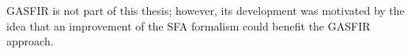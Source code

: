 GASFIR is not part of this thesis; however, its development was motivated by the idea that an improvement of the SFA formalism could benefit the GASFIR approach.


